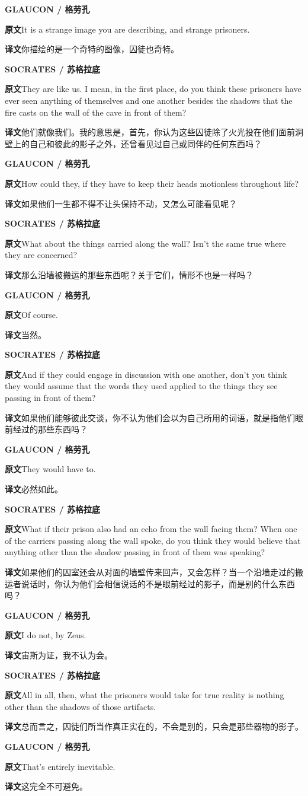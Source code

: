 \documentclass[UTF8,zihao=-4]{ctexart}
\newcommand{\BodyFont}{\fontsize{10.5pt}{15.5pt}\selectfont}
\newcommand{\origlabel}{\textbf{原文}\quad}
\newcommand{\translabel}{\textbf{译文}\quad}
\newenvironment{enblock}{\par\noindent\begingroup\BodyFont\origlabel}{\par\endgroup}
\newenvironment{zhblock}{\par\noindent\begingroup\BodyFont\translabel}{\par\endgroup\vspace{0.35em}}
\newcommand{\en}[1]{\begin{enblock}#1\end{enblock}}
\newcommand{\zh}[1]{\begin{zhblock}#1\end{zhblock}}
\newcommand{\speaker}[2]{\par\medskip\noindent\textbf{#1 / #2}\par}
\begin{document}
\speaker{GLAUCON}{格劳孔}
\en{It is a strange image you are describing, and strange prisoners.}
\zh{你描绘的是一个奇特的图像，囚徒也奇特。}

\speaker{SOCRATES}{苏格拉底}
\en{They are like us. I mean, in the first place, do you think these prisoners have ever seen anything of themselves and one another besides the shadows that the fire casts on the wall of the cave in front of them?}
\zh{他们就像我们。我的意思是，首先，你认为这些囚徒除了火光投在他们面前洞壁上的自己和彼此的影子之外，还曾看见过自己或同伴的任何东西吗？}

\speaker{GLAUCON}{格劳孔}
\en{How could they, if they have to keep their heads motionless throughout life?}
\zh{如果他们一生都不得不让头保持不动，又怎么可能看见呢？}

\speaker{SOCRATES}{苏格拉底}
\en{What about the things carried along the wall? Isn't the same true where they are concerned?}
\zh{那么沿墙被搬运的那些东西呢？关于它们，情形不也是一样吗？}

\speaker{GLAUCON}{格劳孔}
\en{Of course.}
\zh{当然。}

\speaker{SOCRATES}{苏格拉底}
\en{And if they could engage in discussion with one another, don't you think they would assume that the words they used applied to the things they see passing in front of them?}
\zh{如果他们能够彼此交谈，你不认为他们会以为自己所用的词语，就是指他们眼前经过的那些东西吗？}

\speaker{GLAUCON}{格劳孔}
\en{They would have to.}
\zh{必然如此。}

\speaker{SOCRATES}{苏格拉底}
\en{What if their prison also had an echo from the wall facing them? When one of the carriers passing along the wall spoke, do you think they would believe that anything other than the shadow passing in front of them was speaking?}
\zh{如果他们的囚室还会从对面的墙壁传来回声，又会怎样？当一个沿墙走过的搬运者说话时，你认为他们会相信说话的不是眼前经过的影子，而是别的什么东西吗？}

\speaker{GLAUCON}{格劳孔}
\en{I do not, by Zeus.}
\zh{宙斯为证，我不认为会。}

\speaker{SOCRATES}{苏格拉底}
\en{All in all, then, what the prisoners would take for true reality is nothing other than the shadows of those artifacts.}
\zh{总而言之，囚徒们所当作真正实在的，不会是别的，只会是那些器物的影子。}

\speaker{GLAUCON}{格劳孔}
\en{That's entirely inevitable.}
\zh{这完全不可避免。}
\end{document}

